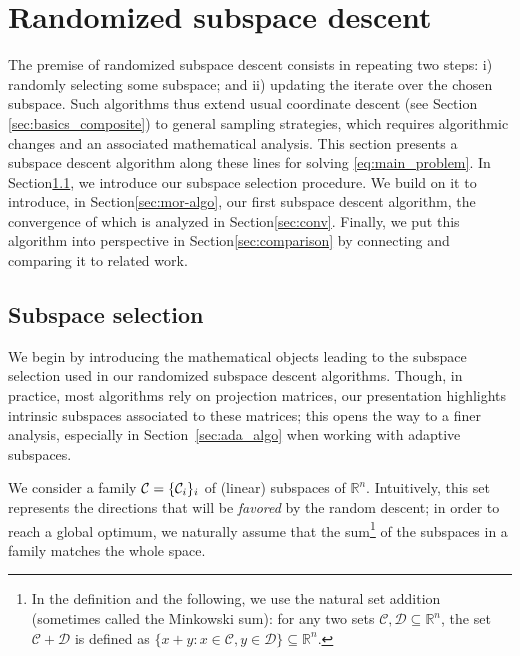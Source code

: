 \section{Randomized subspace descent}
\label{sec:mor-randomized-subspace}


The premise of randomized subspace descent consists in repeating two steps: i) randomly selecting some subspace; and ii) updating the iterate over the chosen subspace. {Such algorithms thus extend usual coordinate descent (see Section \ref{sec:basics_composite}) to general sampling strategies, which requires algorithmic changes and an associated mathematical analysis. }
This section presents a subspace descent algorithm along these lines for solving \eqref{eq:main_problem}. In Section\;\ref{sec:sub}, we introduce our subspace selection procedure. We build on it to introduce, in Section\;\ref{sec:mor-algo}, our first subspace descent algorithm, the convergence of which is analyzed in Section\;\ref{sec:conv}. Finally, we put this algorithm into perspective in Section\;\ref{sec:comparison} by connecting and comparing it to related work.

\subsection{Subspace selection}\label{sec:sub}

We begin by introducing the mathematical objects leading to the subspace selection used in our randomized subspace descent algorithms. Though, in practice, most algorithms rely on projection matrices, our presentation highlights intrinsic subspaces associated to these matrices; this opens the way to a finer analysis, especially in Section~\ref{sec:ada_algo} when working with adaptive subspaces. 

We consider a family $\mathcal{C} = \{ \mathcal{C}_i \}_i$ of {(linear)} subspaces of $\mathbb{R}^n$. Intuitively, this set represents the directions that will be \emph{favored} by the random descent; in order to reach a global optimum, we naturally assume that the sum\footnote{In the definition and the following, we use the natural set addition (sometimes called the Minkowski sum): for any two sets $\mathcal{C},\mathcal{D}\subseteq\mathbb{R}^n$, the set  $\mathcal{C} + \mathcal{D}$ is defined as $\{x+y : x\in\mathcal{C},y\in\mathcal{D}\}\subseteq\mathbb{R}^n$.} of the subspaces in a family matches the whole space.%

